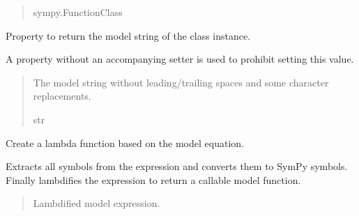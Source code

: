 \documentclass[letterpaper,10pt,english]{sphinxmanual}
\begin{document}
\begin{fulllineitems}
\begin{fulllineitems}
\begin{quote}
\begin{description}
\sphinxAtStartPar
sympy.FunctionClass

\end{description}\end{quote}

\end{fulllineitems}


\begin{fulllineitems}
\label{\detokenize{VPCModel:src.VPCModel.VPCModel.model_string}}
\pysigstartsignatures
{}
\pysigstopsignatures
\sphinxAtStartPar
Property to return the model string of the class instance.

\sphinxAtStartPar
A property without an accompanying setter is used to prohibit setting this value.
\begin{quote}\begin{description}
\sphinxAtStartPar
The model string without leading/trailing spaces and some character replacements.

\sphinxAtStartPar
str

\end{description}\end{quote}

\end{fulllineitems}


\begin{fulllineitems}
\label{\detokenize{VPCModel:src.VPCModel.VPCModel.model_string_to_function}}
\pysigstartsignatures
{}
\pysigstopsignatures
\sphinxAtStartPar
Create a lambda function based on the model equation.

\sphinxAtStartPar
Extracts all symbols from the expression and converts them to SymPy symbols.
Finally lambdifies the expression to return a callable model function.
\begin{quote}\begin{description}
\sphinxAtStartPar
Lambdified model expression.


\end{description}
\end{quote}
\end{fulllineitems}
\end{fulllineitems}
\end{document}
